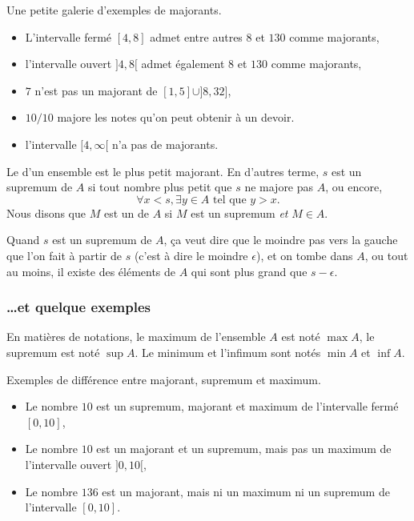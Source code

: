 \begin{example}
Une petite galerie d'exemples de majorants.
\begin{itemize}
\item L'intervalle fermé $[4,8]$ admet entre autres $8$ et $130$ comme majorants,
\item l'intervalle ouvert $]4,8[$ admet également $8$ et $130$ comme majorants,
\item $7$ n'est pas un majorant de $[1,5]\cup]8,32]$,
\item $10/10$ majore les notes qu'on peut obtenir à un devoir.
\item l'intervalle $[4,\infty[$ n'a pas de majorants.
\end{itemize}
\end{example}

\begin{definition}
Le  d'un ensemble est le plus petit majorant. En d'autres terme, $s$ est un supremum de $A$ si tout nombre plus petit que $s$ ne majore pas $A$, ou encore,
\[
  \forall x<s,\exists y\in A\text{ tel que } y>x.
\]
Nous disons que $M$ est un  de $A$ si $M$ est un supremum \emph{et} $M\in A$.
\end{definition}
Quand $s$ est un supremum de $A$, ça veut dire que le moindre pas vers la gauche que l'on fait à partir de $s$ (c'est à dire le moindre $\epsilon$), et on tombe dans $A$, ou tout au moins, il existe des éléments de $A$ qui sont plus grand que $s-\epsilon$.

\subsubsection{\ldots et quelque exemples}

En matières de notations, le maximum de l'ensemble $A$ est noté $\max A$, le supremum est noté $\sup A$. Le minimum et l'infimum sont notés $\min A$ et $\inf A$.

\begin{example}
Exemples de différence entre majorant, supremum et maximum.
\begin{itemize}
\item Le nombre $10$ est un supremum, majorant et maximum de l'intervalle fermé $[0,10]$,
\item Le nombre $10$ est un majorant et un supremum, mais pas un maximum de l'intervalle ouvert $]0,10[$,
\item Le nombre $136$ est un majorant, mais ni un maximum ni un supremum de l'intervalle $[0,10]$.
\end{itemize}
\end{example}

